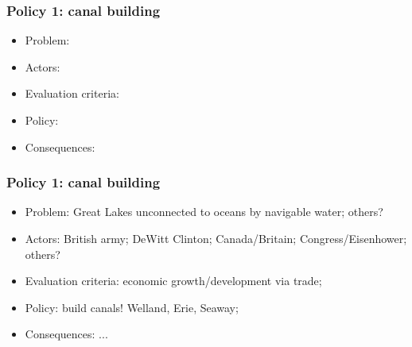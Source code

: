 \documentclass[aspectratio=169]{beamer}
\theoremstyle{principle}
\begin{document}
\begin{frame}
\frametitle{Policy 1: canal building}

\begin{itemize}
\item Problem: 
\bigskip
\bigskip
\item Actors: 
\bigskip
\bigskip
\item Evaluation criteria: 
\bigskip
\bigskip
\item Policy: 
\bigskip
\bigskip
\item Consequences: 
\end{itemize}

\end{frame}

\begin{frame}
\frametitle{Policy 1: canal building}

\begin{itemize}
\item Problem: Great Lakes unconnected to oceans by navigable water; others?
\bigskip
\bigskip
\item Actors: British army; DeWitt Clinton; Canada/Britain; Congress/Eisenhower; others?
\bigskip
\bigskip
\item Evaluation criteria: economic growth/development via trade;
\bigskip
\bigskip
\item Policy: build canals!  Welland, Erie, Seaway;
\bigskip
\bigskip
\item Consequences: ...
\end{itemize}

\end{frame}
\end{document}
